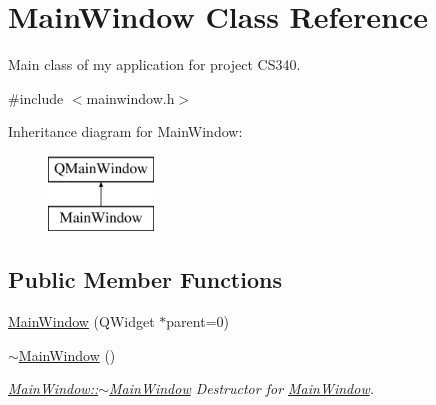 \hypertarget{class_main_window}{\section{Main\-Window Class Reference}
\label{class_main_window}
}


Main class of my application for project C\-S340.  




{\ttfamily \#include $<$mainwindow.\-h$>$}

Inheritance diagram for Main\-Window\-:\begin{figure}[H]
\begin{center}
\leavevmode
\includegraphics[height=2.000000cm]{class_main_window}
\end{center}
\end{figure}
\subsection*{Public Member Functions}
\begin{DoxyCompactItemize}
\item 
\hyperlink{class_main_window_a8b244be8b7b7db1b08de2a2acb9409db}{Main\-Window} (Q\-Widget $\ast$parent=0)
\item 
\hypertarget{class_main_window_ae98d00a93bc118200eeef9f9bba1dba7}{\hyperlink{class_main_window_ae98d00a93bc118200eeef9f9bba1dba7}{$\sim$\-Main\-Window} ()}\label{class_main_window_ae98d00a93bc118200eeef9f9bba1dba7}

\begin{DoxyCompactList}\small\item\em \hyperlink{class_main_window_ae98d00a93bc118200eeef9f9bba1dba7}{Main\-Window\-::$\sim$\-Main\-Window} Destructor for \hyperlink{class_main_window}{Main\-Window}. \end{DoxyCompactList}\end{DoxyCompactItemize}
